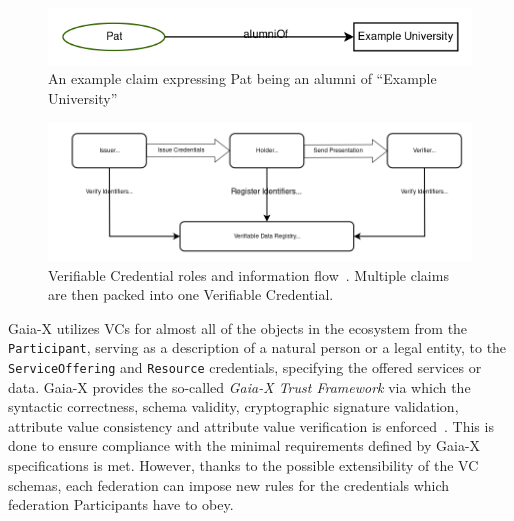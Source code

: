\begin{figure}
    \centering
    \includegraphics[width=\textwidth]{figures/verifiable-credential-claim-example.png}
    \caption{An example claim expressing Pat being an alumni of ``Example University''~\cite{verifiable_credentials}}\label{fig:verifiable-credential-claim}
\end{figure}
\begin{figure}
    \centering
    \includegraphics[width=\textwidth]{figures/verifiable-credentials.png}
    \caption{Verifiable Credential roles and information flow~\cite{verifiable_credentials}. Multiple claims are then packed into one Verifiable Credential.}\label{fig:verifiable-credentials}
\end{figure}

Gaia-X utilizes VCs for almost all of the objects in the ecosystem from the \texttt{Participant}, serving as a description of a natural person or a legal entity, to the \texttt{ServiceOffering} and \texttt{Resource} credentials, specifying the offered services or data.
Gaia-X provides the so-called \textit{Gaia-X Trust Framework} via which the syntactic correctness, schema validity, cryptographic signature validation, attribute value consistency and attribute value verification is enforced~\cite{gaiax_architecture_document}.
This is done to ensure compliance with the minimal requirements defined by Gaia-X specifications is met.
However, thanks to the possible extensibility of the VC schemas, each federation can impose new rules for the credentials which federation Participants have to obey.

